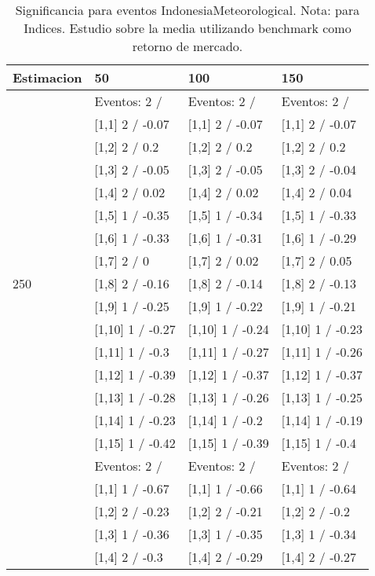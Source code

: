 \begin{table}

\caption{Significancia para eventos IndonesiaMeteorological. Nota: para Indices. Estudio sobre la media utilizando benchmark como retorno de mercado.}
\centering
\begin{tabular}[t]{llll}
\toprule
Estimacion & 50 & 100 & 150\\
\midrule
 & Eventos:  2 / & Eventos:  2 / & Eventos:  2 /\\
 & {}[1,1] 2  / -0.07 & {}[1,1] 2  / -0.07 & {}[1,1] 2  / -0.07\\
 & {}[1,2] 2  / 0.2 & {}[1,2] 2  / 0.2 & {}[1,2] 2  / 0.2\\
 & {}[1,3] 2  / -0.05 & {}[1,3] 2  / -0.05 & {}[1,3] 2  / -0.04\\
 & {}[1,4] 2  / 0.02 & {}[1,4] 2  / 0.02 & {}[1,4] 2  / 0.04\\
\addlinespace
 & {}[1,5] 1  / -0.35 & {}[1,5] 1  / -0.34 & {}[1,5] 1  / -0.33\\
 & {}[1,6] 1  / -0.33 & {}[1,6] 1  / -0.31 & {}[1,6] 1  / -0.29\\
 & {}[1,7] 2  / 0 & {}[1,7] 2  / 0.02 & {}[1,7] 2  / 0.05\\
250 & {}[1,8] 2  / -0.16 & {}[1,8] 2  / -0.14 & {}[1,8] 2  / -0.13\\
 & {}[1,9] 1  / -0.25 & {}[1,9] 1  / -0.22 & {}[1,9] 1  / -0.21\\
\addlinespace
 & {}[1,10] 1  / -0.27 & {}[1,10] 1  / -0.24 & {}[1,10] 1  / -0.23\\
 & {}[1,11] 1  / -0.3 & {}[1,11] 1  / -0.27 & {}[1,11] 1  / -0.26\\
 & {}[1,12] 1  / -0.39 & {}[1,12] 1  / -0.37 & {}[1,12] 1  / -0.37\\
 & {}[1,13] 1  / -0.28 & {}[1,13] 1  / -0.26 & {}[1,13] 1  / -0.25\\
 & {}[1,14] 1  / -0.23 & {}[1,14] 1  / -0.2 & {}[1,14] 1  / -0.19\\
\addlinespace
 & {}[1,15] 1  / -0.42 & {}[1,15] 1  / -0.39 & {}[1,15] 1  / -0.4\\
 & Eventos:  2 / & Eventos:  2 / & Eventos:  2 /\\
 & {}[1,1] 1  / -0.67 & {}[1,1] 1  / -0.66 & {}[1,1] 1  / -0.64\\
 & {}[1,2] 2  / -0.23 & {}[1,2] 2  / -0.21 & {}[1,2] 2  / -0.2\\
 & {}[1,3] 1  / -0.36 & {}[1,3] 1  / -0.35 & {}[1,3] 1  / -0.34\\
\addlinespace
 & {}[1,4] 2  / -0.3 & {}[1,4] 2  / -0.29 & {}[1,4] 2  / -0.27\\

\end{tabular}
\end{table}
